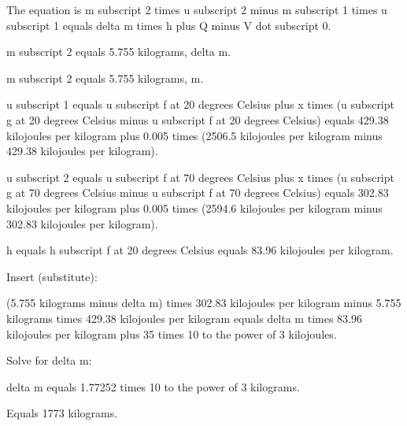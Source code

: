 The equation is m subscript 2 times u subscript 2 minus m subscript 1 times u subscript 1 equals delta m times h plus Q minus V dot subscript 0.

m subscript 2 equals 5.755 kilograms, delta m.

m subscript 2 equals 5.755 kilograms, m.

u subscript 1 equals u subscript f at 20 degrees Celsius plus x times (u subscript g at 20 degrees Celsius minus u subscript f at 20 degrees Celsius) equals 429.38 kilojoules per kilogram plus 0.005 times (2506.5 kilojoules per kilogram minus 429.38 kilojoules per kilogram).

u subscript 2 equals u subscript f at 70 degrees Celsius plus x times (u subscript g at 70 degrees Celsius minus u subscript f at 70 degrees Celsius) equals 302.83 kilojoules per kilogram plus 0.005 times (2594.6 kilojoules per kilogram minus 302.83 kilojoules per kilogram).

h equals h subscript f at 20 degrees Celsius equals 83.96 kilojoules per kilogram.

Insert (substitute):

(5.755 kilograms minus delta m) times 302.83 kilojoules per kilogram minus 5.755 kilograms times 429.38 kilojoules per kilogram equals delta m times 83.96 kilojoules per kilogram plus 35 times 10 to the power of 3 kilojoules.

Solve for delta m:

delta m equals 1.77252 times 10 to the power of 3 kilograms.

Equals 1773 kilograms.